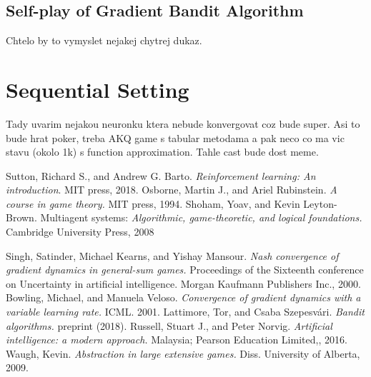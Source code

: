 \documentclass{article}
\theoremstyle{remark}
\theoremstyle{definition}
\begin{document}
\subsection{Self-play of Gradient Bandit Algorithm}
Chtelo by to vymyslet nejakej chytrej dukaz.

\newpage
\section{Sequential Setting}
Tady uvarim nejakou neuronku ktera nebude konvergovat coz bude super. Asi to bude hrat poker, treba AKQ game s tabular metodama a pak neco co ma vic stavu (okolo 1k) s function approximation. Tahle cast bude dost meme. 


\newpage

\begin{thebibliography}{}

Sutton, Richard S., and Andrew G. Barto. \textit{Reinforcement learning: An introduction}. MIT press, 2018.
Osborne, Martin J., and Ariel Rubinstein. \textit{A course in game theory.} MIT press, 1994.
Shoham, Yoav, and Kevin Leyton-Brown. Multiagent systems: \textit{Algorithmic, game-theoretic, and logical foundations.} Cambridge University Press, 2008

Singh, Satinder, Michael Kearns, and Yishay Mansour. \textit{Nash convergence of gradient dynamics in general-sum games.} Proceedings of the Sixteenth conference on Uncertainty in artificial intelligence. Morgan Kaufmann Publishers Inc., 2000.
Bowling, Michael, and Manuela Veloso. \textit{Convergence of gradient dynamics with a variable learning rate.} ICML. 2001.
Lattimore, Tor, and Csaba Szepesvári. \textit{Bandit algorithms.} preprint (2018).
Russell, Stuart J., and Peter Norvig. \textit{Artificial intelligence: a modern approach.} Malaysia; Pearson Education Limited,, 2016.
Waugh, Kevin. \textit{Abstraction in large extensive games.} Diss. University of Alberta, 2009.
\end{thebibliography}
\end{document}
